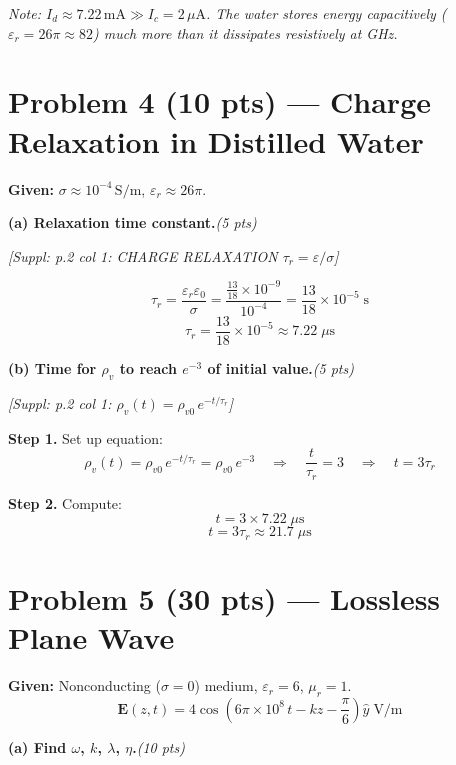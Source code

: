 \documentclass[11pt,letterpaper]{article}
\newcommand{\refbox}[1]{\textcolor{ref}{\textit{[Suppl: #1]}}}
\newcommand{\ptag}[1]{\hfill\textit{(#1 pts)}}
\newcommand{\step}[1]{\medskip\noindent\textbf{Step #1.}\enspace}
\newcommand{\note}[1]{\par\noindent\textcolor{note}{\textit{Note: #1}}}
\begin{document}
\note{$I_d\approx 7.22\,\text{mA}\gg I_c=2\,\mu\text{A}$. The water stores energy
capacitively ($\varepsilon_r=26\pi\approx82$) much more than it dissipates resistively at GHz.}

\section*{Problem 4 (10 pts) --- Charge Relaxation in Distilled Water}

\textbf{Given:} $\sigma\approx10^{-4}\,\text{S/m}$, $\varepsilon_r\approx26\pi$.

\medskip

\textbf{(a) Relaxation time constant.}\ptag{5}

\refbox{p.2 col 1: CHARGE RELAXATION $\tau_r=\varepsilon/\sigma$}

\[
\tau_r = \frac{\varepsilon_r\varepsilon_0}{\sigma}
= \frac{\tfrac{13}{18}\times10^{-9}}{10^{-4}}
= \frac{13}{18}\times10^{-5}\;\text{s}
\]
\[
\boxed{\tau_r = \frac{13}{18}\times10^{-5}\approx 7.22\;\mu\text{s}}
\]

\medskip

\textbf{(b) Time for $\rho_v$ to reach $e^{-3}$ of initial value.}\ptag{5}

\refbox{p.2 col 1: $\rho_v(t)=\rho_{v0}\,e^{-t/\tau_r}$}

\step{1} Set up equation:
\[
\rho_v(t)=\rho_{v0}\,e^{-t/\tau_r}=\rho_{v0}\,e^{-3}
\quad\Rightarrow\quad \frac{t}{\tau_r}=3 \quad\Rightarrow\quad t=3\tau_r
\]

\step{2} Compute:
\[
t = 3\times 7.22\;\mu\text{s}
\]
\[
\boxed{t = 3\tau_r\approx 21.7\;\mu\text{s}}
\]

\section*{Problem 5 (30 pts) --- Lossless Plane Wave}

\textbf{Given:} Nonconducting ($\sigma=0$) medium, $\varepsilon_r=6$, $\mu_r=1$.
\[
\mathbf{E}(z,t)=4\cos\!\left(6\pi\times10^8\,t - kz - \frac{\pi}{6}\right)\hat{y}\;\text{V/m}
\]

\medskip

\textbf{(a) Find $\omega$, $k$, $\lambda$, $\eta$.}\ptag{10}
\end{document}
